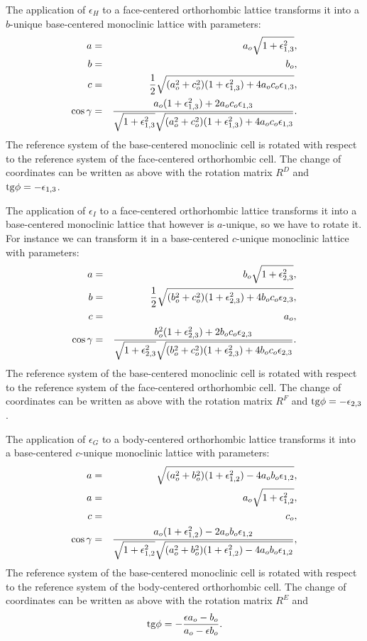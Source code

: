 \documentclass[12pt,a4paper]{article}
\begin{document}
The application of $\epsilon_H$ to a face-centered orthorhombic lattice
transforms it into a $b$-unique base-centered monoclinic lattice with
parameters:
\begin{eqnarray}
a&=&a_o \sqrt{1+\epsilon_{1,3}^2}, \\
b&=&b_o,  \\
c&=&{1\over 2} \sqrt{(a_o^2+c_o^2)(1+\epsilon_{1,3}^2)+4a_oc_o\epsilon_{1,3}}, \\
\cos\gamma &=& {a_o (1+\epsilon_{1,3}^2)+2a_oc_o\epsilon_{1,3} \over
\sqrt{1+\epsilon_{1,3}^2} \sqrt{(a_o^2+c_o^2)
(1+\epsilon_{1,3}^2)+4a_oc_o\epsilon_{1,3}}}. 
\end{eqnarray}
The reference system of the base-centered monoclinic cell is rotated 
with respect to the reference system of the face-centered orthorhombic cell. 
The change of coordinates can be written as above with the rotation matrix 
$R^D$ and ${\rm tg}\phi=-\epsilon_{1,3}$.

The application of $\epsilon_I$ to a face-centered orthorhombic lattice
transforms it into a base-centered monoclinic lattice that however is 
$a$-unique, so we have to rotate it. For instance we can transform it
in a base-centered $c$-unique monoclinic lattice with parameters:
\begin{eqnarray}
a&=&b_o \sqrt{1+\epsilon_{2,3}^2}, \\
b&=&{1\over 2} \sqrt{(b_o^2+c_o^2)(1+\epsilon_{2,3}^2)+4b_oc_o
\epsilon_{2,3}}, \\
c&=&a_o,  \\
\cos\gamma &=& {b_o^2 (1+\epsilon_{2,3}^2)+2b_oc_o\epsilon_{2,3} \over
\sqrt{1+\epsilon_{2,3}^2} \sqrt{(b_o^2+c_o^2)
(1+\epsilon_{2,3}^2)+4b_oc_o\epsilon_{2,3}}}. 
\end{eqnarray}
The reference system of the base-centered monoclinic cell is rotated 
with respect to the reference system of the face-centered orthorhombic cell. 
The change of coordinates can be written as above with the rotation matrix 
$R^F$ and 
${\rm tg}\phi=-\epsilon_{2,3}$.

The application of $\epsilon_G$ to a body-centered orthorhombic lattice
transforms it into a base-centered $c$-unique monoclinic lattice with 
parameters:
\begin{eqnarray}
a&=&\sqrt{(a_o^2+b_o^2)(1+\epsilon_{1,2}^2)-4a_ob_o\epsilon_{1,2}}, \\
a&=&a_o \sqrt{1+\epsilon_{1,2}^2}, \\
c&=&c_o,  \\
\cos\gamma &=& {a_o (1+\epsilon_{1,2}^2)-2a_ob_o\epsilon_{1,2} \over
\sqrt{1+\epsilon_{1,2}^2} \sqrt{(a_o^2+b_o^2)
(1+\epsilon_{1,2}^2)-4a_ob_o\epsilon_{1,2}}}, 
\end{eqnarray}
The reference system of the base-centered monoclinic cell is rotated 
with respect to the reference system of the body-centered orthorhombic cell. 
The change of coordinates can be written as above with the rotation matrix 
$R^E$ and
\begin{equation}
{\rm tg} \phi = -{ \epsilon a_o - b_o \over a_o - \epsilon b_o }.
\end{equation}
\end{document}
